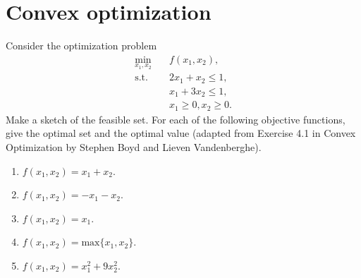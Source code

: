 \setcounter{section}{0}

\section{Convex optimization}
Consider the optimization problem 
\begin{align*}
    \min_{x_1,x_2} \quad&f(x_1,x_2),\\
    \text{s.t.} \quad&2x_1 +x_2 \leq 1,\\
    &x_1 + 3x_2 \leq 1,\\
    &x_1\geq 0, x_2 \geq 0.
\end{align*}
Make a sketch of the feasible set. For each of the following objective functions, give the optimal set and the optimal value (adapted from Exercise 4.1 in Convex Optimization by Stephen Boyd and Lieven Vandenberghe).
\begin{enumerate}
    \item $f(x_1,x_2) = x_1 + x_2$.
    \item $f(x_1,x_2) = -x_1 - x_2$.
    \item $f(x_1,x_2) = x_1 $.
    \item $f(x_1,x_2) = \text{max}\{x_1,x_2\}$.
    \item $f(x_1,x_2) = x_1^2 + 9x_2^2$.
\end{enumerate}

